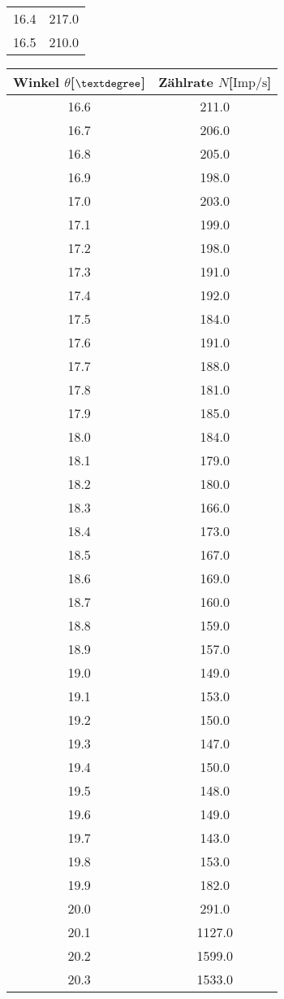 \begin{table}
\begin{minipage}{0.5\textwidth}
\begin{tabular}{c c}
16.4		&217.0\\
16.5		&210.0\\
    \bottomrule
\end{tabular}
\end{minipage}
\begin{minipage}{0.5\textwidth}
\centering
\label{tab:cuwerte2}
\begin{tabular}{c c}
    \toprule
    Winkel $\theta$[$\textdegree$] & Zählrate $N$[$\si{{\text{Imp}}\per\second}$]\\
    \midrule
16.6	&	211.0\\
16.7	&	206.0\\
16.8	&	205.0\\
16.9	&	198.0\\
17.0	&	203.0\\
17.1	&	199.0\\
17.2	&	198.0\\
17.3	&	191.0\\
17.4	&	192.0\\
17.5	&	184.0\\
17.6	&	191.0\\
17.7	&	188.0\\
17.8	&	181.0\\
17.9	&	185.0\\
18.0	&	184.0\\
18.1	&	179.0\\
18.2	&	180.0\\
18.3	&	166.0\\
18.4	&	173.0\\
18.5	&	167.0\\
18.6	&	169.0\\
18.7	&	160.0\\
18.8	&	159.0\\
18.9	&	157.0\\
19.0	&	149.0\\
19.1	&	153.0\\
19.2	&	150.0\\
19.3	&	147.0\\
19.4	&	150.0\\
19.5	&	148.0\\
19.6	&	149.0\\
19.7	&	143.0\\
19.8	&	153.0\\
19.9	&	182.0\\
20.0	&	291.0\\
20.1	&	1127.0\\
20.2	&	1599.0\\
20.3	&	1533.0\\

\end{tabular}
\end{minipage}
\end{table}
